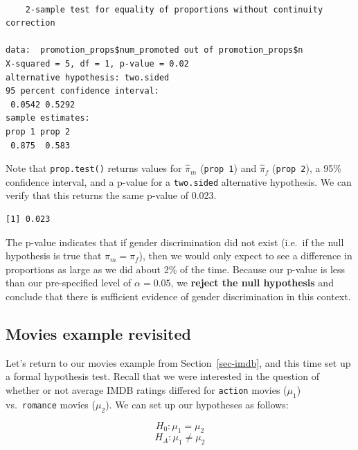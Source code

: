 \documentclass[
  letterpaper,
  DIV=11,
  numbers=noendperiod]{scrreprt}
\newenvironment{Shaded}{\begin{snugshade}}{\end{snugshade}}
\newcommand{\NormalTok}[1]{\textcolor[rgb]{0.00,0.23,0.31}{#1}}
\newcommand{\SpecialCharTok}[1]{\textcolor[rgb]{0.37,0.37,0.37}{#1}}
\theoremstyle{definition}
\theoremstyle{remark}
\begin{document}
\begin{verbatim}

    2-sample test for equality of proportions without continuity correction

data:  promotion_props$num_promoted out of promotion_props$n
X-squared = 5, df = 1, p-value = 0.02
alternative hypothesis: two.sided
95 percent confidence interval:
 0.0542 0.5292
sample estimates:
prop 1 prop 2 
 0.875  0.583 
\end{verbatim}

Note that \texttt{prop.test()} returns values for \(\hat{\pi}_m\)
(\texttt{prop\ 1}) and \(\hat{\pi}_f\) (\texttt{prop\ 2}), a 95\%
confidence interval, and a p-value for a \texttt{two.sided} alternative
hypothesis. We can verify that this returns the same p-value of 0.023.

\begin{Shaded}
\end{Shaded}

\begin{verbatim}
[1] 0.023
\end{verbatim}

The p-value indicates that if gender discrimination did not exist
(i.e.~if the null hypothesis is true that \(\pi_m = \pi_f\)), then we
would only expect to see a difference in proportions as large as we did
about 2\% of the time. Because our p-value is less than our
pre-specified level of \(\alpha = 0.05\), we \textbf{reject the null
hypothesis} and conclude that there is sufficient evidence of gender
discrimination in this context.

\hypertarget{movies-example-revisited}{%
\subsection{Movies example revisited}\label{movies-example-revisited}}

Let's return to our movies example from Section~\ref{sec-imdb}, and this
time set up a formal hypothesis test. Recall that we were interested in
the question of whether or not average IMDB ratings differed for
\texttt{action} movies (\(\mu_1\)) vs.~\texttt{romance} movies
(\(\mu_2\)). We can set up our hypotheses as follows:

\[H_0: \mu_1 = \mu_2\] \[H_A: \mu_1 \neq \mu_2\]
\end{document}
